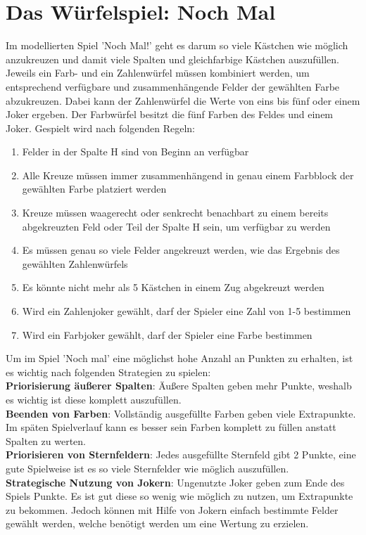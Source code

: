 \newpage
\section{Das Würfelspiel: Noch Mal}
Im modellierten Spiel 'Noch Mal!' geht es darum so viele Kästchen wie möglich anzukreuzen und damit viele Spalten und gleichfarbige Kästchen auszufüllen. Jeweils ein Farb- und ein Zahlenwürfel müssen kombiniert werden, um entsprechend verfügbare und zusammenhängende Felder der gewählten Farbe abzukreuzen. Dabei kann der Zahlenwürfel die Werte von eins bis fünf oder einem Joker ergeben. Der Farbwürfel besitzt die fünf Farben des Feldes und einem Joker. Gespielt wird nach folgenden Regeln:
\begin{enumerate}
    \item Felder in der Spalte H sind von Beginn an verfügbar
    \item Alle Kreuze müssen immer zusammenhängend in genau einem Farbblock der gewählten Farbe platziert werden
    \item Kreuze müssen waagerecht oder senkrecht benachbart zu einem bereits abgekreuzten Feld oder Teil der Spalte H sein, um verfügbar zu werden
    \item Es müssen genau so viele Felder angekreuzt werden, wie das Ergebnis des gewählten Zahlenwürfels
    \item Es könnte nicht mehr als 5 Kästchen in einem Zug abgekreuzt werden
    \item Wird ein Zahlenjoker gewählt, darf der Spieler eine Zahl von 1-5 bestimmen
    \item Wird ein Farbjoker gewählt, darf der Spieler eine Farbe bestimmen
\end{enumerate}

Um im Spiel 'Noch mal' eine möglichst hohe Anzahl an Punkten zu erhalten, ist es wichtig nach folgenden Strategien zu spielen:\\
\textbf{Priorisierung äußerer Spalten}: Äußere Spalten geben mehr Punkte, weshalb es wichtig ist diese komplett auszufüllen. \\
\textbf{Beenden von Farben}: Vollständig ausgefüllte Farben geben viele Extrapunkte. Im späten Spielverlauf kann es besser sein Farben komplett zu füllen anstatt Spalten zu werten. \\
 \textbf{Priorisieren von Sternfeldern}: Jedes ausgefüllte Sternfeld gibt 2 Punkte, eine gute Spielweise ist es so viele Sternfelder wie möglich auszufüllen. \\
\textbf{Strategische Nutzung von Jokern}: Ungenutzte Joker geben zum Ende des Spiels Punkte. Es ist gut diese so wenig wie möglich zu nutzen, um Extrapunkte zu bekommen. Jedoch können mit Hilfe von Jokern einfach bestimmte Felder gewählt werden, welche benötigt werden um eine Wertung zu erzielen. 


